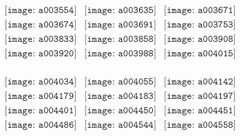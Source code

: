 \documentclass{article}
\begin{document}
        \clearpage
        \begin{figure}[H]
 \begin{center}$
 \begin{array}{cccc}
\texttt{[image: a003554]}&\texttt{[image: a003635]}&\texttt{[image: a003671]}\\\texttt{[image: a003674]}&\texttt{[image: a003691]}&\texttt{[image: a003753]}\\\texttt{[image: a003833]}&\texttt{[image: a003858]}&\texttt{[image: a003908]}\\\texttt{[image: a003920]}&\texttt{[image: a003988]}&\texttt{[image: a004015]}\\
\end{array}$
\end{center}
\end{figure}

\begin{figure}[H]
 \begin{center}$
 \begin{array}{cccc}
\texttt{[image: a004034]}&\texttt{[image: a004055]}&\texttt{[image: a004142]}\\\texttt{[image: a004179]}&\texttt{[image: a004183]}&\texttt{[image: a004197]}\\\texttt{[image: a004401]}&\texttt{[image: a004450]}&\texttt{[image: a004451]}\\\texttt{[image: a004486]}&\texttt{[image: a004544]}&\texttt{[image: a004558]}\\
\end{array}$
\end{center}
\end{figure}
\end{document}
